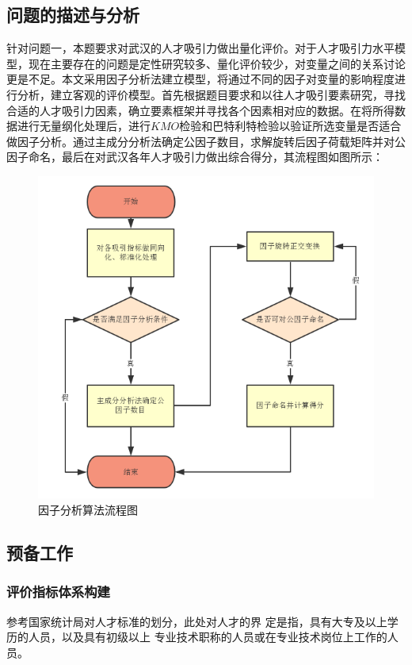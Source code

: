 \documentclass{whutmod}
\begin{document}
	\subsection{问题的描述与分析}

	针对问题一，本题要求对武汉的人才吸引力做出量化评价。对于人才吸引力水平模型，现在主要存在的问题是定性研究较多、量化评价较少，对变量之间的关系讨论更是不足。本文采用因子分析法建立模型，将通过不同的因子对变量的影响程度进行分析，建立客观的评价模型。首先根据题目要求和以往人才吸引要素研究，寻找合适的人才吸引力因素，确立要素框架并寻找各个因素相对应的数据。在将所得数据进行无量纲化处理后，进行$KMO$检验和巴特利特检验以验证所选变量是否适合做因子分析。通过主成分分析法确定公因子数目，求解旋转后因子荷载矩阵并对公因子命名，最后在对武汉各年人才吸引力做出综合得分，其流程图如图\label{llll}所示：


	\begin{figure}[H]
		\centering
		\includegraphics[width=\textwidth]{figures/1111.png}
		\caption{因子分析算法流程图}\label{llll}
	\end{figure}

		\subsection{预备工作}
		\subsubsection{评价指标体系构建}
		参考国家统计局对人才标准的划分，此处对人才的界 定是指，具有大专及以上学历的人员，以及具有初级以上 专业技术职称的人员或在专业技术岗位上工作的人员。
		
\end{document}
